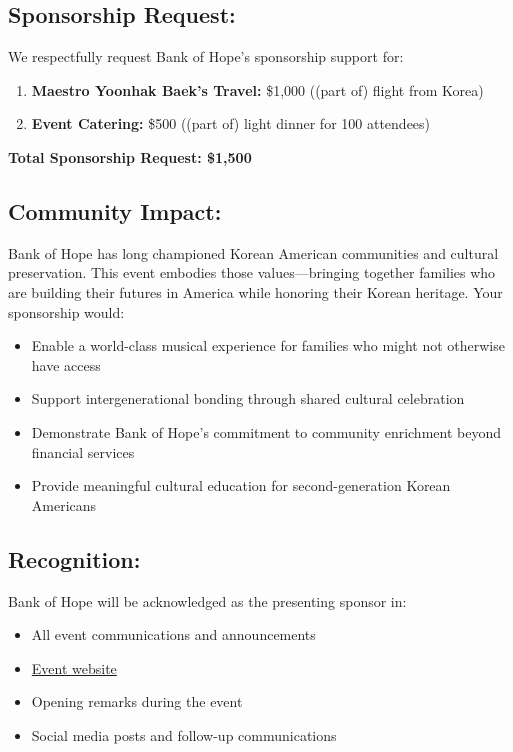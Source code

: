\documentclass[11pt,letterpaper]{article}
\begin{document}
\subsection*{Sponsorship Request:}

We respectfully request Bank of Hope's sponsorship support for:

\begin{enumerate}
\item \textbf{Maestro Yoonhak Baek's Travel:} \$1,000 ((part of) flight from Korea)
\item \textbf{Event Catering:} \$500 ((part of) light dinner for 100 attendees)
\end{enumerate}

\noindent
\textbf{Total Sponsorship Request: \$1,500}

\subsection*{Community Impact:}

Bank of Hope has long championed Korean American communities and cultural preservation. This event embodies those values---bringing together families who are building their futures in America while honoring their Korean heritage. Your sponsorship would:

\begin{itemize}[leftmargin=*]
\item Enable a world-class musical experience for families who might not otherwise have access
\item Support intergenerational bonding through shared cultural celebration
\item Demonstrate Bank of Hope's commitment to community enrichment beyond financial services
\item Provide meaningful cultural education for second-generation Korean Americans
\end{itemize}

\subsection*{Recognition:}

Bank of Hope will be acknowledged as the presenting sponsor in:

\begin{itemize}[leftmargin=*]
\item All event communications and announcements
\item \href{https://sungheeyun.github.io/event-announcements/korean-family-harmony}{Event website}
\item Opening remarks during the event
\item Social media posts and follow-up communications
\end{itemize}
\end{document}
